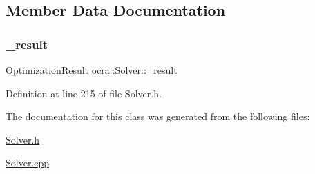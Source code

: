 \subsection{Member Data Documentation}
\hypertarget{classocra_1_1Solver_abe284a585b558a2c11a8b99cb7a410da}{}\label{classocra_1_1Solver_abe284a585b558a2c11a8b99cb7a410da} 
\subsubsection{\texorpdfstring{\+\_\+result}{\_result}}
{\footnotesize\ttfamily \hyperlink{structocra_1_1OptimizationResult}{Optimization\+Result} ocra\+::\+Solver\+::\+\_\+result\hspace{0.3cm}{\ttfamily [protected]}}



Definition at line 215 of file Solver.\+h.



The documentation for this class was generated from the following files\+:\begin{DoxyCompactItemize}
\item 
\hyperlink{Solver_8h}{Solver.\+h}\item 
\hyperlink{Solver_8cpp}{Solver.\+cpp}\end{DoxyCompactItemize}
